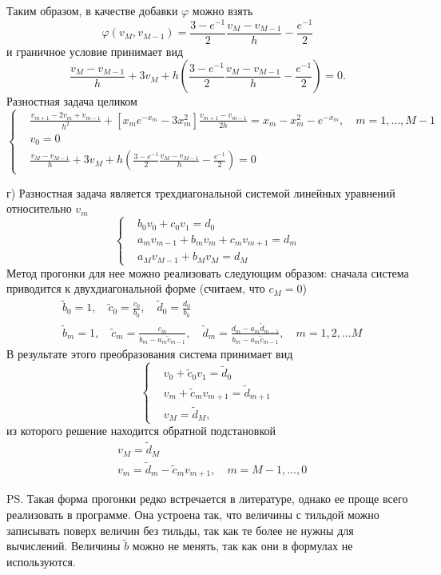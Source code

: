 \documentclass[12pt]{article}
\begin{document}
Таким образом, в качестве добавки $\varphi$ можно взять
\[
\varphi(v_M, v_{M-1}) = \frac{3 - e^{-1}}{2} \frac{v_M - v_{M-1}}{h} - \frac{e^{-1}}{2}
\]
и граничное условие принимает вид
\[
\frac{v_M - v_{M-1}}{h} + 3v_M + h\left(\frac{3 - e^{-1}}{2} \frac{v_M - v_{M-1}}{h} - \frac{e^{-1}}{2}\right) = 0.
\]
Разностная задача целиком 
\[\left\{\begin{aligned}
&\frac{v_{m+1} - 2v_m + v_{m-1}}{h^2}  + [x_m e^{-x_m} - 3x_m^2] \frac{v_{m+1} - v_{m-1}}{2h}
= x_m - x_m^2 - e^{-x_m}, \quad m = 1, \dots, M - 1\\
&v_0 = 0\\
&\frac{v_M - v_{M-1}}{h} + 3v_M + h\left(\frac{3 - e^{-1}}{2} \frac{v_M - v_{M-1}}{h} - \frac{e^{-1}}{2}\right) = 0
\end{aligned}\right.\]

г) Разностная задача является трехдиагональной системой линейных уравнений относительно $v_m$
\[\left\{\begin{aligned}
&b_0 v_0 + c_0 v_1 = d_0\\
&a_m v_{m-1} + b_m v_m + c_m v_{m+1} = d_m\\
&a_M v_{M-1} + b_M v_M = d_M
\end{aligned}\right.\]
Метод прогонки для нее можно реализовать следующим образом: сначала система приводится к двухдиагональной форме (считаем, что $c_M = 0$)
\begin{align*}
&\tilde b_0 = 1, \quad \tilde c_0 = \frac{c_0}{b_0},\quad \tilde d_0 = \frac{d_0}{b_0}\\
&\tilde b_m = 1, \quad \tilde c_m = \frac{c_m}{b_m - a_m \tilde c_{m-1}}, \quad
\tilde d_m = \frac{d_m - a_m \tilde d_{m-1}}{b_m - a_m \tilde c_{m-1}},\quad m = 1, 2, \dots M
\end{align*}
В результате этого преобразования система принимает вид
\[\left\{\begin{aligned}
&v_0 + \tilde c_0 v_1 = \tilde d_0\\
&v_m + \tilde c_m v_{m+1} = \tilde d_{m+1}\\
&v_M = \tilde d_M,
\end{aligned}\right.\]
из которого решение находится обратной подстановкой
\begin{align*}
&v_M = \tilde d_M\\
&v_m = \tilde d_{m} - \tilde c_m v_{m+1},\quad m = M-1, \dots, 0
\end{align*}

PS. Такая форма прогонки редко встречается в литературе, однако ее проще всего реализовать в программе. Она устроена так, что величины с тильдой можно записывать поверх величин без тильды, так как те более не нужны для вычислений. Величины $\tilde b$ можно не менять, так как они в формулах не используются.
\end{document}
